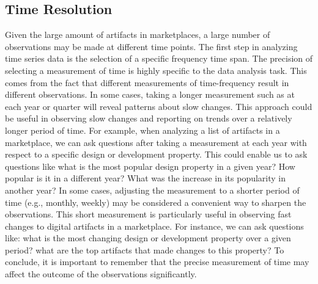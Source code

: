 \subsection{Time Resolution}
Given the large amount of artifacts in marketplaces, a large number of observations may be made at different time points.
The first step in analyzing time series data is the selection of a specific frequency time span.
The precision of selecting a measurement of time is highly specific to the data analysis task.
This comes from the fact that different measurements of time-frequency result in different observations.
In some cases, taking a longer measurement such as at each year or quarter will reveal patterns about slow changes.
This approach could be useful in observing slow changes and reporting on trends over a relatively longer period of time.
For example, when analyzing a list of artifacts in a marketplace, we can ask questions after taking a measurement at each year with respect to a specific design or development property.
This could enable us to ask questions like what is the most popular design property in a given year? How popular is it in a different year? What was the increase in its popularity in another year?
In some cases, adjusting the measurement to a shorter period of time (e.g., monthly, weekly) may be considered a convenient way to sharpen the observations.
This short measurement is particularly useful in observing fast changes to digital artifacts in a marketplace.
For instance, we can ask questions like: what is the most changing design or development property over a given period? what are the top artifacts that made changes to this property?
To conclude, it is important to remember that the precise measurement of time may affect the outcome of the observations significantly.

